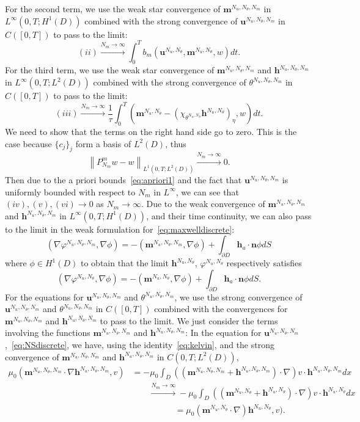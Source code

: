 \documentclass[10pt,letterpaper,twoside]{amsart}
\theoremstyle{definition}{\newtheorem{definition}[lemma]{Definition}}
\theoremstyle{note}{\newtheorem{claim}{Claim}[section]
\newtheorem*{claim*}{Claim}}
\numberwithin{equation}{section}
\newcommand{\dom}{D}
\newcommand{\norm}[1]{\left\| #1 \right\|}
\newcommand{\Grad}{\nabla}
\newcommand{\bma}{\mathbf{m}^{N_u,N_\theta,N_m}}
\newcommand{\bha}{\mathbf{h}^{N_u,N_\theta,N_m}}
\newcommand{\bua}{\mathbf{u}^{N_u,N_\theta,N_m}}
\newcommand{\tha}{\theta^{N_u,N_\theta,N_m}}
\newcommand{\pha}{\varphi^{N_u,N_\theta,N_m}}
\newcommand{\bmb}{\mathbf{m}^{N_u,N_\theta}}
\newcommand{\bhb}{\mathbf{h}^{N_u,N_\theta}}
\newcommand{\bub}{\mathbf{u}^{N_u,N_\theta}}
\newcommand{\thb}{\theta^{N_u,N_\theta}}
\newcommand{\phb}{\varphi^{N_u,N_\theta}}
\newcommand{\bh}{\mathbf{h}}
\begin{document}
For the second term, we use the weak star convergence of $\bma$ in $L^\infty(0,T;H^1(\dom))$ combined with the strong convergence of $\bua$ in $C([0,T])$ to pass to the limit:
\begin{equation*}
	(ii)\stackrel{N_m\to\infty}{\longrightarrow}\int_0^T b_m(\bub,\bmb,w) dt.
\end{equation*}
For the third term, we use the weak star convergence of $\bma$ and $\bha$ in $L^\infty(0,T;L^2(\dom))$ combined with the strong convergence of $\tha$ in $C([0,T])$ to pass to the limit:
\begin{equation*}
	(iii)\stackrel{N_m\to\infty}{\longrightarrow}\frac1{\tau}\int_0^T (\bmb-(\chi_{\thb}\bhb)_\eta,w) dt. 
\end{equation*}
We need to show that the terms on the right hand side go to zero. This is the case because $\{c_j\}_j$ form a basis of $L^2(\dom)$, thus
\begin{equation*}
	\norm{P_{N_m}^mw-w}_{L^1(0,T;L^2(\dom))}\stackrel{N_m\to\infty}{\longrightarrow} 0.
\end{equation*}
Then due to the a priori bounds~\eqref{eq:apriori1} and the fact that $\bua$ is uniformly bounded with respect to $N_m$ in $L^\infty$, we can see that $(iv), (v), (vi)\to 0$ as $N_m\to \infty$. Due to the weak convergence of $\bma$ and $\bha$ in $L^\infty(0,T;H^1(\dom))$, and their time continuity, we can also pass to the limit in the weak formulation for~\eqref{eq:maxwelldiscrete}:
\begin{equation*}
	(\Grad\pha,\Grad\phi) = -(\bma,\Grad\phi) + \int_{\partial\dom} \bh_a\cdot\mathbf{n}\phi dS
\end{equation*}
where $\phi\in H^1(\dom)$ to obtain that  the limit $\bhb$, $\phb$ respectively satisfies
\begin{equation*}
	(\Grad\phb,\Grad\phi) = -(\bmb,\Grad\phi) + \int_{\partial\dom} \bh_a\cdot\mathbf{n}\phi dS.
\end{equation*}
For the equations for $\bua$ and $\tha$, we use the strong convergence of $\bua$ and $\tha$ in $C([0,T])$ combined with the convergences for $\bma$ and $\bha$ to pass to the limit. We just consider the terms involving the functions $\bma$ and $\bha$:
In the equation for $\bua$,~\eqref{eq:NSdiscrete}, we have, using the identity~\eqref{eq:kelvin}, and the strong convergence of $\bma$ and $\bha$ in $C(0,T;L^2(\dom))$,
\begin{align*}
	\mu_0 (\bma\cdot\Grad \bha,v)&=-\mu_0 \int_{\dom}((\bma+\bha)\cdot\Grad)v \cdot\bha dx\\ &\qquad \stackrel{N_m\to\infty}{\longrightarrow} -\mu_0 \int_{\dom}((\bmb+\bhb)\cdot\Grad)v \cdot\bhb dx\\
	&\qquad  \qquad \quad =\mu_0 (\bmb\cdot\Grad)\bhb,v).
\end{align*}
\end{document}
